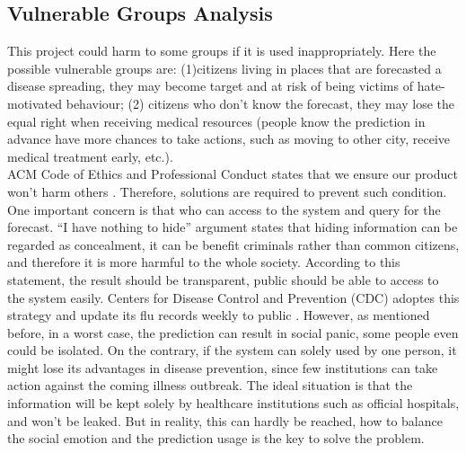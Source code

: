 \subsection{Vulnerable Groups Analysis}
This project could harm to some groups if it is used inappropriately. Here the possible vulnerable groups are: (1)citizens living in places that are forecasted a disease spreading, they may become target and at risk of being victims of hate-motivated behaviour; (2) citizens who don't know the forecast, they may lose the equal right when receiving medical resources (people know the prediction in advance have more chances to take actions, such as moving to other city, receive medical treatment early, etc.). \\
ACM Code of Ethics and Professional Conduct states that we ensure our product won't harm others \cite{ACM_C}. Therefore, solutions are required to prevent such condition. One important concern is that who can access to the system and query for the forecast. ``I have nothing to hide'' argument states that hiding information can be regarded as concealment, it can be benefit criminals rather than common citizens, and therefore it is more harmful to the whole society\cite{solove2007ven}. According to this statement, the result should be transparent, public should be able to access to the system easily. Centers for Disease Control and Prevention (CDC) adoptes this strategy and update its flu records weekly to public \cite{cdc:fluView}. However, as mentioned before, in a worst case, the prediction can result in social panic, some people even could be isolated. On the contrary, if the system can solely used by one person, it might lose its advantages in disease prevention, since few institutions can take action against the coming illness outbreak. The ideal situation is that the information will be kept solely by healthcare institutions such as official hospitals, and won't be leaked. But in reality, this can hardly be reached, how to balance the social emotion and the prediction usage is the key to solve the problem.
 